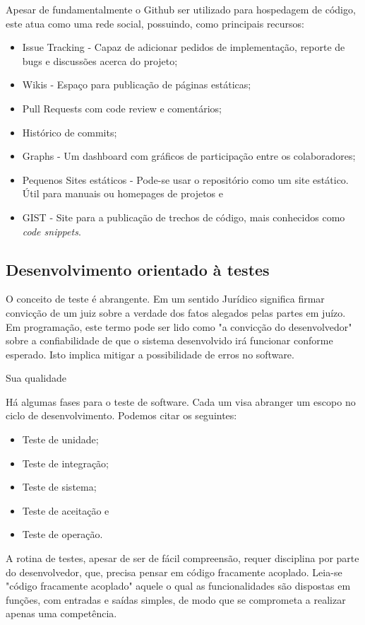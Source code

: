\documentclass[
	article,			%
	12pt,				%
	oneside,			%
	a4paper,			%
	english,			
	brazil,
	sumario=tradicional
	]{abntex2}
\begin{document}
Apesar de fundamentalmente o Github ser utilizado para hospedagem de código, este atua como uma rede social, possuindo, como principais recursos:

\begin{itemize}
	\item{Issue Tracking - Capaz de adicionar pedidos de implementação, reporte de bugs e discussões acerca do projeto;}
	\item{Wikis - Espaço para publicação de páginas estáticas;}
	\item{Pull Requests com code review e comentários;}
	\item{Histórico de commits;}
	\item{Graphs - Um dashboard com gráficos de participação entre os colaboradores;}
	\item{Pequenos Sites estáticos - Pode-se usar o repositório como um site estático. Útil para manuais ou homepages de projetos e}
	\item{GIST - Site para a publicação de trechos de código, mais conhecidos como \textit{code snippets}.}
\end{itemize}


\subsection{Desenvolvimento orientado à testes}

O conceito de teste é abrangente. Em um sentido Jurídico significa firmar convicção de um juiz sobre a verdade dos fatos alegados pelas partes em juízo. Em programação, este termo pode ser lido como "a convicção do desenvolvedor" sobre a confiabilidade de que o sistema desenvolvido irá funcionar conforme esperado. Isto implica mitigar a possibilidade de erros no software.

Sua qualidade 

Há algumas fases para o teste de software. Cada um visa abranger um escopo no ciclo de desenvolvimento. Podemos citar os seguintes:
\begin{itemize}
	\item Teste de unidade;
	\item Teste de integração;
	\item Teste de sistema;
	\item Teste de aceitação e
	\item Teste de operação.
\end{itemize}

A rotina de testes, apesar de ser de fácil compreensão, requer disciplina por parte do desenvolvedor, que, precisa pensar em código fracamente acoplado. Leia-se "código fracamente acoplado" aquele o qual as funcionalidades são dispostas em funções, com entradas e saídas simples, de modo que se comprometa a realizar apenas uma competência.
\end{document}
